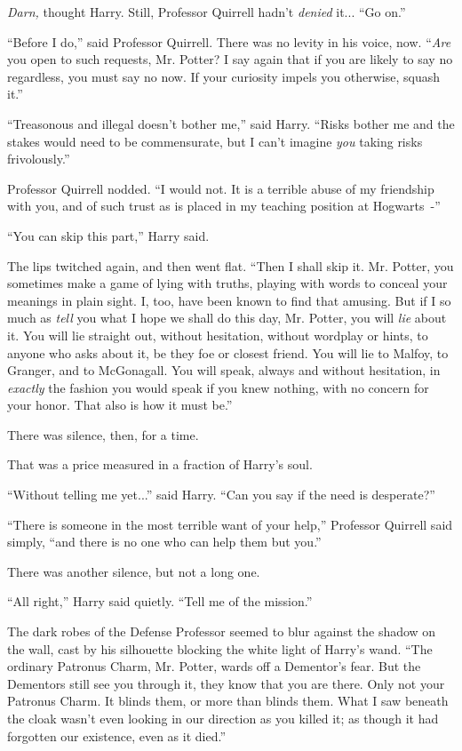 \emph{Darn,} thought Harry. Still, Professor Quirrell hadn't \emph{denied} it... ``Go on.''

``Before I do,'' said Professor Quirrell. There was no levity in his voice, now. ``\emph{Are} you open to such requests, Mr. Potter? I say again that if you are likely to say no regardless, you must say no now. If your curiosity impels you otherwise, squash it.''

``Treasonous and illegal doesn't bother me,'' said Harry. ``Risks bother me and the stakes would need to be commensurate, but I can't imagine \emph{you} taking risks frivolously.''

Professor Quirrell nodded. ``I would not. It is a terrible abuse of my friendship with you, and of such trust as is placed in my teaching position at Hogwarts~-''

``You can skip this part,'' Harry said.

The lips twitched again, and then went flat. ``Then I shall skip it. Mr. Potter, you sometimes make a game of lying with truths, playing with words to conceal your meanings in plain sight. I, too, have been known to find that amusing. But if I so much as \emph{tell} you what I hope we shall do this day, Mr. Potter, you will \emph{lie} about it. You will lie straight out, without hesitation, without wordplay or hints, to anyone who asks about it, be they foe or closest friend. You will lie to Malfoy, to Granger, and to McGonagall. You will speak, always and without hesitation, in \emph{exactly} the fashion you would speak if you knew nothing, with no concern for your honor. That also is how it must be.''

There was silence, then, for a time.

That was a price measured in a fraction of Harry's soul.

``Without telling me yet...'' said Harry. ``Can you say if the need is desperate?''

``There is someone in the most terrible want of your help,'' Professor Quirrell said simply, ``and there is no one who can help them but you.''

There was another silence, but not a long one.

``All right,'' Harry said quietly. ``Tell me of the mission.''

The dark robes of the Defense Professor seemed to blur against the shadow on the wall, cast by his silhouette blocking the white light of Harry's wand. ``The ordinary Patronus Charm, Mr. Potter, wards off a Dementor's fear. But the Dementors still see you through it, they know that you are there. Only not your Patronus Charm. It blinds them, or more than blinds them. What I saw beneath the cloak wasn't even looking in our direction as you killed it; as though it had forgotten our existence, even as it died.''

